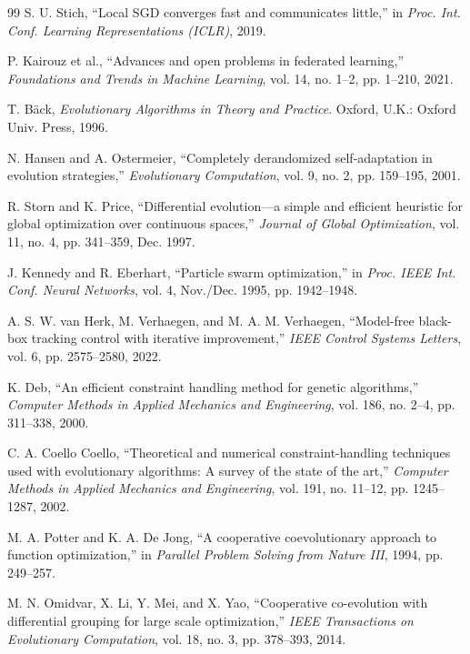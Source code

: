 \documentclass[conference]{IEEEtran}
\begin{document}
\begin{thebibliography}{99}
 S. U. Stich, ``Local SGD converges fast and communicates little,'' in \emph{Proc. Int. Conf. Learning Representations (ICLR)}, 2019.

 P. Kairouz et al., ``Advances and open problems in federated learning,'' \emph{Foundations and Trends in Machine Learning}, vol. 14, no. 1--2, pp. 1--210, 2021.

 T. B\"ack, \emph{Evolutionary Algorithms in Theory and Practice}. Oxford, U.K.: Oxford Univ. Press, 1996.

 N. Hansen and A. Ostermeier, ``Completely derandomized self-adaptation in evolution strategies,'' \emph{Evolutionary Computation}, vol. 9, no. 2, pp. 159--195, 2001.

 R. Storn and K. Price, ``Differential evolution---a simple and efficient heuristic for global optimization over continuous spaces,'' \emph{Journal of Global Optimization}, vol. 11, no. 4, pp. 341--359, Dec. 1997.

 J. Kennedy and R. Eberhart, ``Particle swarm optimization,'' in \emph{Proc. IEEE Int. Conf. Neural Networks}, vol. 4, Nov./Dec. 1995, pp. 1942--1948.

 A. S. W. van Herk, M. Verhaegen, and M. A. M. Verhaegen, ``Model-free black-box tracking control with iterative improvement,'' \emph{IEEE Control Systems Letters}, vol. 6, pp. 2575--2580, 2022.

 K. Deb, ``An efficient constraint handling method for genetic algorithms,'' \emph{Computer Methods in Applied Mechanics and Engineering}, vol. 186, no. 2--4, pp. 311--338, 2000.

 C. A. Coello Coello, ``Theoretical and numerical constraint-handling techniques used with evolutionary algorithms: A survey of the state of the art,'' \emph{Computer Methods in Applied Mechanics and Engineering}, vol. 191, no. 11--12, pp. 1245--1287, 2002.

 M. A. Potter and K. A. De Jong, ``A cooperative coevolutionary approach to function optimization,'' in \emph{Parallel Problem Solving from Nature III}, 1994, pp. 249--257.

 M. N. Omidvar, X. Li, Y. Mei, and X. Yao, ``Cooperative co-evolution with differential grouping for large scale optimization,'' \emph{IEEE Transactions on Evolutionary Computation}, vol. 18, no. 3, pp. 378--393, 2014.


\end{thebibliography}
\end{document}
